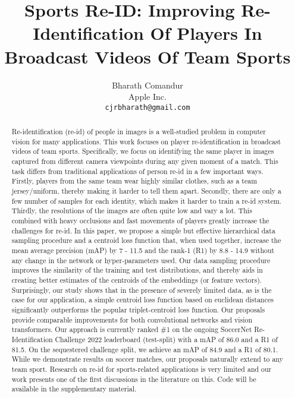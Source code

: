 \documentclass{article}
\title{Sports Re-ID: Improving Re-Identification Of Players In Broadcast Videos Of Team Sports}
\author{Bharath Comandur \\
  Apple Inc.\\
  \texttt{cjrbharath@gmail.com} \\
}
\begin{document}
\maketitle

\begin{abstract}
  Re-identification (re-id) of people in images is a well-studied problem in computer vision for many applications. This work focuses on player re-identification in broadcast videos of team sports. Specifically, we focus on identifying the same player in images captured from different camera viewpoints during any given moment of a match. This task differs from traditional applications of person re-id in a few important ways. Firstly, players from the same team wear highly similar clothes, such as a team jersey/uniform, thereby making it harder to tell them apart. Secondly, there are only a few number of samples for each identity, which makes it harder to train a re-id system. Thirdly, the resolutions of the images are often quite low and vary a lot. This combined with heavy occlusions and fast movements of players greatly increase the challenges for re-id. In this paper, we propose a simple but effective hierarchical data sampling procedure and a centroid loss function that, when used together, increase the mean average precision (mAP) by 7 - 11.5 and the rank-1 (R1) by 8.8 - 14.9 without any change in the network or hyper-parameters used. Our data sampling procedure improves the similarity of the training and test distributions, and thereby aids in creating better estimates of the centroids of the embeddings (or feature vectors). Surprisingly, our study shows that in the presence of severely limited data, as is the case for our application, a simple centroid loss function based on euclidean distances significantly outperforms the popular triplet-centroid loss function. Our proposals provide comparable improvements for both convolutional networks and vision transformers. Our approach is currently ranked \#1 on the ongoing SoccerNet Re-Identification Challenge 2022 leaderboard (test-split) with a mAP of 86.0 and a R1 of 81.5. On the sequestered challenge split, we achieve an mAP of 84.9 and a R1 of 80.1. While we demonstrate results on soccer matches, our proposals naturally extend to any team sport. Research on re-id for sports-related applications is very limited and our work presents one of the first discussions in the literature on this. Code will be available in the supplementary material.
 
\end{abstract}
\end{document}
